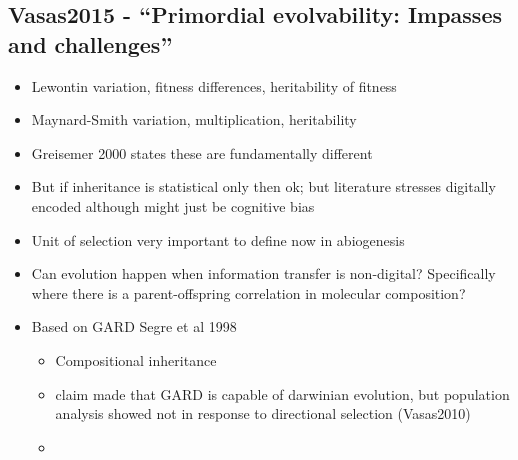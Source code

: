 		\hypertarget{vasas2015---primordial-evolvability-impasses-and-challenges}{\subsection{Vasas2015
				- ``Primordial evolvability: Impasses and
				challenges''}\label{vasas2015---primordial-evolvability-impasses-and-challenges}}
		
		\begin{itemize}
			\item
			
			Lewontin variation, fitness differences, heritability of fitness
			
			\item
			
			Maynard-Smith variation, multiplication, heritability
			
			\item
			
			Greisemer 2000 states these are fundamentally different
			
			\item
			
			But if inheritance is statistical only then ok; but literature
			stresses digitally encoded although might just be cognitive bias
			
			\item
			
			Unit of selection very important to define now in abiogenesis
			
			\item
			
			Can evolution happen when information transfer is non-digital?
			Specifically where there is a parent-offspring correlation in
			molecular composition?
			
			\item
			
			Based on GARD Segre et al 1998
			
			
			\begin{itemize}
				\item
				
				Compositional inheritance
				
				\item
				
				claim made that GARD is capable of darwinian evolution, but
				population analysis showed not in response to directional selection
				(Vasas2010)
				
				\item
				

\end{itemize}
\end{itemize}
